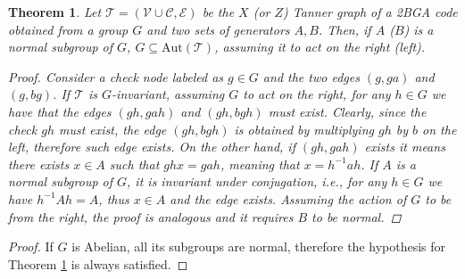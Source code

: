 \documentclass[10pt,a4paper]{amsart}
\newtheorem{theorem}{Theorem}
\newcommand{\setc}{\mathcal{C}}
\newcommand{\sete}{\mathcal{E}}
\newcommand{\setv}{\mathcal{V}}
\begin{document}
\begin{theorem}
\label{th:invariance}
    Let $\mathcal{T} = (\setv \cup \setc,\sete)$ be the $X$ (or $Z$) Tanner graph of a 2BGA code obtained from a group $G$ and two sets of generators $A,B$. Then, if $A$ ($B$) is a normal subgroup of $G$, $G \subseteq \mathrm{Aut}(\mathcal{T})$, assuming it to act on the right (left).
    \begin{proof}
        Consider a check node labeled as $g \in G$ and the two edges $(g,ga)$ and $(g,bg)$. If $\mathcal{T}$ is $G$-invariant, assuming $G$ to act on the right, for any $h\in G$ we have that the edges $(gh,gah)$ and $(gh,bgh)$ must exist. Clearly, since the check $gh$ must exist, the edge $(gh,bgh)$ is obtained by multiplying $gh$ by $b$ on the left, therefore such edge exists. On the other hand, if $(gh,gah)$ exists it means there exists $x\in A$ such that $ghx = gah$, meaning that $x=h^{-1}ah$. If $A$ is a normal subgroup of $G$, it is invariant under conjugation, \textit{i.e.}, for any $h \in G$ we have $h^{-1}Ah=A$, thus $x\in A$ and the edge exists. Assuming the action of $G$ to be from the right, the proof is analogous and it requires $B$ to be normal.
    \end{proof}
\end{theorem}

    \begin{proof}
    If $G$ is Abelian, all its subgroups are normal, therefore the hypothesis for Theorem \ref{th:invariance} is always satisfied.
    \end{proof}
\end{document}
